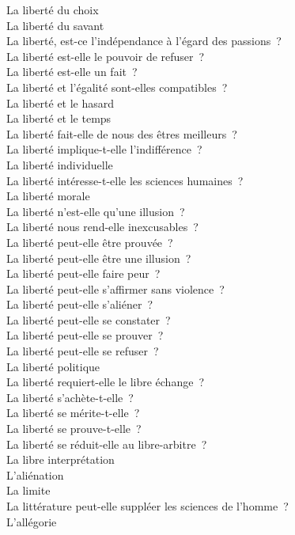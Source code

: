 \documentclass[a4paper,12pt]{article}
\begin{document}
La liberté du choix \\
La liberté du savant \\
La liberté, est-ce l'indépendance à l'égard des passions ? \\
La liberté est-elle le pouvoir de refuser ? \\
La liberté est-elle un fait ? \\
La liberté et l'égalité sont-elles compatibles ? \\
La liberté et le hasard \\
La liberté et le temps \\
La liberté fait-elle de nous des êtres meilleurs ? \\
La liberté implique-t-elle l'indifférence ? \\
La liberté individuelle \\
La liberté intéresse-t-elle les sciences humaines ? \\
La liberté morale \\
La liberté n'est-elle qu'une illusion ? \\
La liberté nous rend-elle inexcusables ? \\
La liberté peut-elle être prouvée ? \\
La liberté peut-elle être une illusion ? \\
La liberté peut-elle faire peur ? \\
La liberté peut-elle s'affirmer sans violence ? \\
La liberté peut-elle s'aliéner ? \\
La liberté peut-elle se constater ? \\
La liberté peut-elle se prouver ? \\
La liberté peut-elle se refuser ? \\
La liberté politique \\
La liberté requiert-elle le libre échange ? \\
La liberté s'achète-t-elle ? \\
La liberté se mérite-t-elle ? \\
La liberté se prouve-t-elle ? \\
La liberté se réduit-elle au libre-arbitre ? \\
La libre interprétation \\
L'aliénation \\
La limite \\
La littérature peut-elle suppléer les sciences de l'homme ? \\
L'allégorie \\
\end{document}
